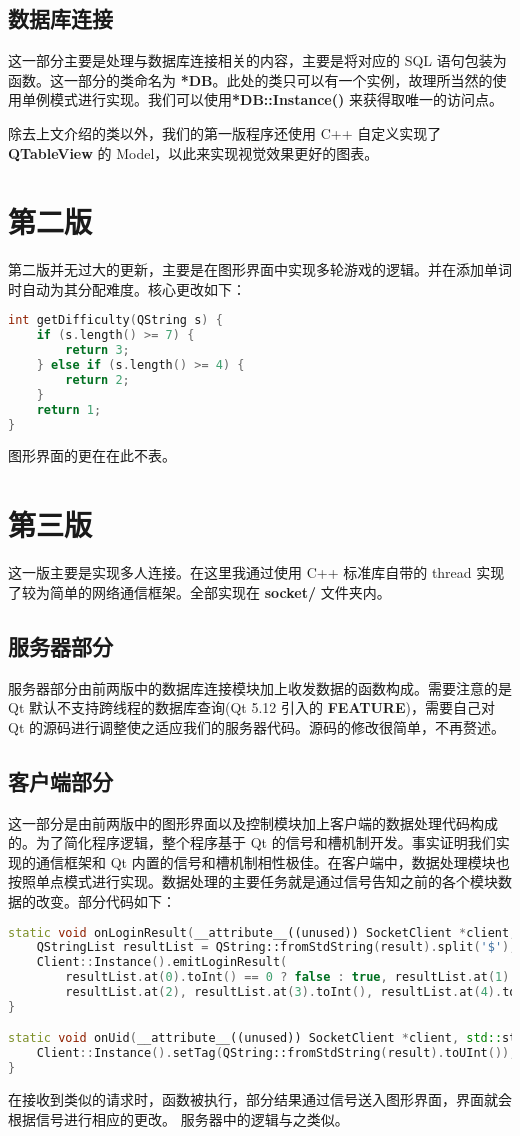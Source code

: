 \documentclass[blue,normal,cn]{elegantnote}
\begin{document}
\subsection{数据库连接}
这一部分主要是处理与数据库连接相关的内容，主要是将对应的 SQL 语句包装为函数。这一部分的类命名为 \textbf{*DB}。此处的类只可以有一个实例，故理所当然的使用单例模式进行实现。我们可以使用\textbf{*DB::Instance()} 来获得取唯一的访问点。


除去上文介绍的类以外，我们的第一版程序还使用 C++ 自定义实现了 \textbf{QTableView} 的 Model，以此来实现视觉效果更好的图表。

\section{第二版}
第二版并无过大的更新，主要是在图形界面中实现多轮游戏的逻辑。并在添加单词时自动为其分配难度。核心更改如下：
\begin{lstlisting}[language=C++]
int getDifficulty(QString s) {
	if (s.length() >= 7) {
		return 3;
	} else if (s.length() >= 4) {
		return 2;
	}
	return 1;
}
\end{lstlisting}
图形界面的更在在此不表。
\section{第三版}
这一版主要是实现多人连接。在这里我通过使用 C++ 标准库自带的 thread 实现了较为简单的网络通信框架。全部实现在 \textbf{socket/} 文件夹内。
\subsection{服务器部分}
服务器部分由前两版中的数据库连接模块加上收发数据的函数构成。需要注意的是 Qt 默认不支持跨线程的数据库查询(Qt 5.12 引入的 \textbf{FEATURE})，需要自己对 Qt 的源码进行调整使之适应我们的服务器代码。源码的修改很简单，不再赘述。
\subsection{客户端部分}
这一部分是由前两版中的图形界面以及控制模块加上客户端的数据处理代码构成的。为了简化程序逻辑，整个程序基于 Qt 的信号和槽机制开发。事实证明我们实现的通信框架和 Qt 内置的信号和槽机制相性极佳。在客户端中，数据处理模块也按照单点模式进行实现。数据处理的主要任务就是通过信号告知之前的各个模块数据的改变。部分代码如下：
\begin{lstlisting}[language=C++]
static void onLoginResult(__attribute__((unused)) SocketClient *client, std::string result) {
	QStringList resultList = QString::fromStdString(result).split('$');
	Client::Instance().emitLoginResult(
		resultList.at(0).toInt() == 0 ? false : true, resultList.at(1),
		resultList.at(2), resultList.at(3).toInt(), resultList.at(4).toInt());
}

static void onUid(__attribute__((unused)) SocketClient *client, std::string result) {
	Client::Instance().setTag(QString::fromStdString(result).toUInt());
}
\end{lstlisting}
在接收到类似的请求时，函数被执行，部分结果通过信号送入图形界面，界面就会根据信号进行相应的更改。
服务器中的逻辑与之类似。
\end{document}
